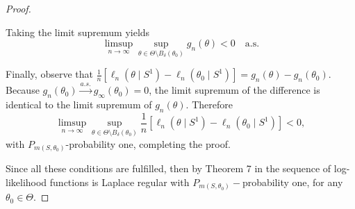 \documentclass[accepted]{uai2026} %
\theoremstyle{boldremark}
\begin{document}
\begin{proof}
\begin{itemize}
Taking the limit supremum yields
\begin{equation*}
\limsup_{n \to \infty}\sup_{\theta \in \Theta \setminus B_\delta(\theta_0)} g_n(\theta) < 0 \quad \text{a.s.}
\end{equation*}

Finally, observe that $\frac{1}{n} \left[ \ell_n(\theta\mid S^1) - \ell_n(\theta_0\mid S^1) \right] = g_n(\theta) - g_n(\theta_0)$. Because $g_n(\theta_0) \xrightarrow{a.s.} g_{\infty}(\theta_0) = 0$, the limit supremum of the difference is identical to the limit supremum of $g_n(\theta)$. Therefore
\begin{equation*}
\limsup_{n \to \infty}\sup_{\theta \in \Theta \setminus B_\delta(\theta_0)} \frac{1}{n} \left[ \ell_n(\theta\mid S^1) - \ell_n(\theta_0\mid S^1) \right] < 0,
\end{equation*}
with $P_{m(S,\theta_0)}$-probability one, completing the proof.
\end{itemize}

Since all these conditions are fulfilled, then by Theorem 7 in \citet{Kass1990TheVO} the sequence of log-likelihood functions is Laplace regular with $P_{m(S,\theta_0)}-$probability one, for any $\theta_0\in \Theta$.
\end{proof}
\end{document}
